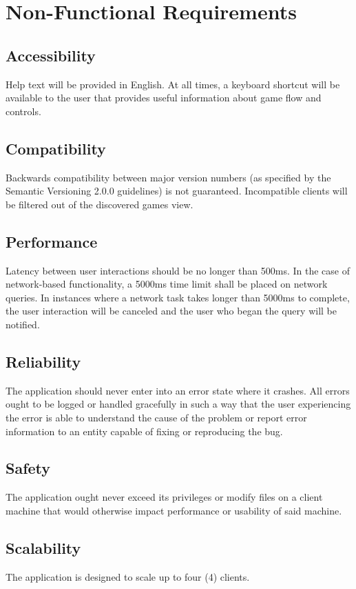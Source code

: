 \section{Non-Functional Requirements}

\subsection{Accessibility}
Help text will be provided in English. At all times, a keyboard shortcut will
be available to the user that provides useful information about game flow and
controls.

\subsection{Compatibility}
Backwards compatibility between major version numbers (as specified by the
Semantic Versioning 2.0.0 guidelines) is not guaranteed. Incompatible clients
will be filtered out of the discovered games view.

\subsection{Performance}
Latency between user interactions should be no longer than 500ms. In the
case of network-based functionality, a 5000ms time limit shall be placed on
network queries. In instances where a network task takes longer than 5000ms to
complete, the user interaction will be canceled and the user who began the
query will be notified.

\subsection{Reliability}
The application should never enter into an error state where it crashes. All
errors ought to be logged or handled gracefully in such a way that the user
experiencing the error is able to understand the cause of the problem or report
error information to an entity capable of fixing or reproducing the bug.

\subsection{Safety}
The application ought never exceed its privileges or modify files on a client
machine that would otherwise impact performance or usability of said machine.

\subsection{Scalability}
The application is designed to scale up to four (4) clients.

